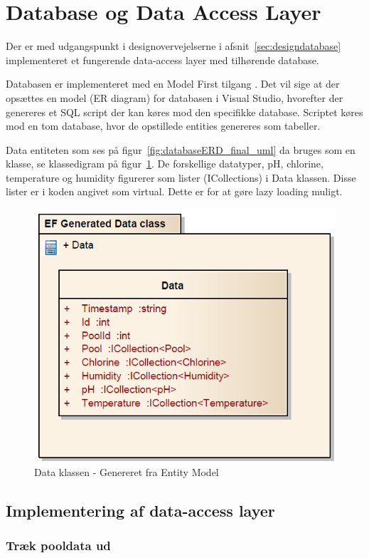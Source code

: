 \section{Database og Data Access Layer}

Der er med udgangspunkt i designovervejelserne i afsnit~\ref{sec:designdatabase} implementeret et fungerende data-access layer med tilhørende database.

Databasen er implementeret med en Model First tilgang \cite{microsoftdatadevelopercenter2016}. Det vil sige at der opsættes en model (ER diagram) for databasen i Visual Studio, hvorefter der genereres et SQL script der kan køres mod den specifikke database. Scriptet køres mod en tom database, hvor de opstillede entities genereres som tabeller.

Data entiteten som ses på figur~\ref{fig:databaseERD_final_uml} da bruges som en klasse, se klassedigram på figur~\ref{fig:efGeneratedData}. De forskellige datatyper, pH, chlorine, temperature og humidity figurerer som lister (ICollections) i Data klassen. Disse lister er i koden angivet som virtual. Dette er for at gøre lazy loading muligt.

\begin{figure}
\centering
\includegraphics[width=0.5\linewidth]{figs/implementering/efGeneratedData.PNG}
\caption{Data klassen - Genereret fra Entity Model}
\label{fig:efGeneratedData}
\end{figure}


\subsection{Implementering af data-access layer}


\subsubsection{Træk pooldata ud}

